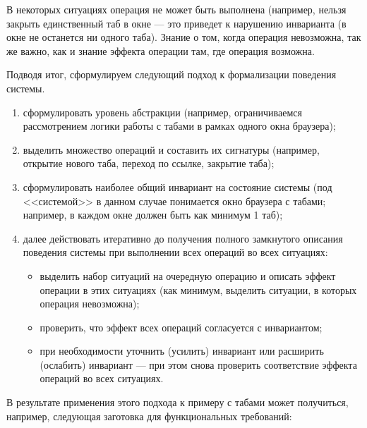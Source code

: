 \documentclass[14pt, twoside]{extreport}
\begin{document}
В некоторых ситуациях операция не может быть выполнена (например, нельзя закрыть единственный таб в окне --- это приведет к нарушению инварианта (в окне не останется ни одного таба). Знание о том, когда операция невозможна, так же важно, как и знание эффекта операции там, где операция возможна.

Подводя итог, сформулируем следующий подход к формализации поведения системы.

\begin{enumerate}
    \item сформулировать уровень абстракции (например, ограничиваемся рассмотрением логики работы с табами в рамках одного окна браузера);
    \item выделить множество операций и составить их сигнатуры (например, открытие нового таба, переход по ссылке, закрытие таба);
    \item сформулировать наиболее общий инвариант на состояние системы (под <<системой>> в данном случае понимается окно браузера с табами; например, в каждом окне должен быть как минимум 1 таб);
    \item далее действовать итеративно до получения полного замкнутого описания поведения системы при выполнении всех операций во всех ситуациях:
        \begin{itemize}
          \item выделить набор ситуаций на очередную операцию и описать эффект операции в этих ситуациях (как минимум, выделить ситуации, в которых операция невозможна);
          \item проверить, что эффект всех операций согласуется с инвариантом;
          \item при необходимости уточнить (усилить) инвариант или расширить (ослабить) инвариант --- при этом снова проверить соответствие эффекта операций во всех ситуациях.

        \end{itemize}
\end{enumerate}


В результате применения этого подхода к примеру с табами может получиться, например, следующая заготовка для функциональных требований:
\end{document}
